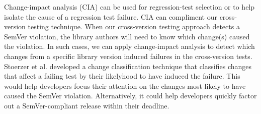 Change-impact analysis (CIA) \cite{Chianti,FaultTracer,Stoerzer} can
be used for regression-test selection or to help isolate the cause of
a regression test failure.
%
CIA can compliment our cross-version testing technique.
%
When our cross-version testing approach detects a SemVer violation,
the library authors will need to know which change(s) caused the
violation. In such cases, we can apply change-impact analysis
\cite{Stoerzer} to detect which changes from a specific library
version induced failures in the cross-version tests. Stoerzer et
al. \cite{Stoerzer} developed a change classification technique that
classifies changes that affect a failing test by their likelyhood to
have induced the failure. This would help developers focus their
attention on the changes most likely to have caused the SemVer
violation. Alternatively, it could help developers quickly factor out
a SemVer-compliant release within their deadline.


